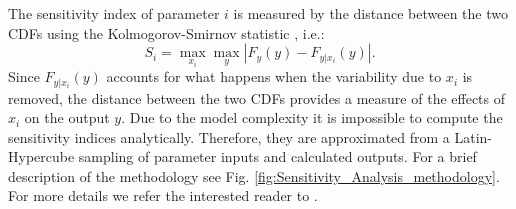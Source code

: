 \documentclass[gmd, manuscript]{copernicus}
\begin{document}
The sensitivity index of parameter $i$ is measured by the distance between the two CDFs using the Kolmogorov-Smirnov statistic 
\citep{kolmogorov1933sulla, smirnov1939estimation}, i.e.:
\begin{equation}
 S_i = \max_{x_i} \max_{y} | F_y(y) - F_{y|x_i}(y) |.
\end{equation}
Since $F_{y|x_i}(y)$ accounts for what happens when the variability due to $x_i$ is removed, the distance between the two CDFs provides a measure of the effects of
$x_i$ on the output $y$. 
Due to the model complexity it is impossible to compute the sensitivity indices analytically. Therefore, they are approximated from a Latin-Hypercube sampling of parameter 
inputs and calculated outputs.
For a brief description of the methodology see Fig. \ref{fig:Sensitivity_Analysis_methodology}. For more details we refer the interested reader to \citet{pianosi_simple_2015}. 
\end{document}
